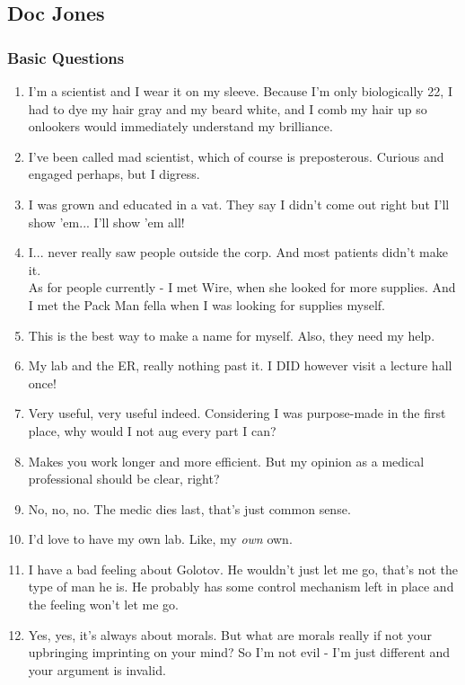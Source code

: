 \def\pfcname{Doc Jones}
\subsection{\pfcname}
\subsubsection{Basic Questions}
\begin{enumerate}
	\setlength\itemsep{-8mm}
	\item I'm a scientist and I wear it on my sleeve. Because I'm only biologically 22, I had to dye my hair gray and my beard white, and I comb my hair up so onlookers would immediately understand my brilliance.
	\item I've been called mad scientist, which of course is preposterous. Curious and engaged perhaps, but I digress.
	\item I was grown and educated in a vat. They say I didn't come out right but I'll show 'em... I'll show 'em all!
	\item I... never really saw people outside the corp. And most patients didn't make it.
		\\%
		As for people currently - I met Wire, when she looked for more supplies.
		And I met the Pack Man fella when I was looking for supplies myself.
	\item This is the best way to make a name for myself. Also, they need my help.
	\item My lab and the ER, really nothing past it. I DID however visit a lecture hall once!
	\item Very useful, very useful indeed. Considering I was purpose-made in the first place, why would I not aug every part I can?
	\item Makes you work longer and more efficient. But my opinion as a medical professional should be clear, right?
	\item No, no, no. The medic dies last, that's just common sense.
	\item I'd love to have my own lab. Like, my \textit{own} own.
	\item I have a bad feeling about Golotov. He wouldn't just let me go, that's not the type of man he is. He probably has some control mechanism left in place and the feeling won't let me go.
	\item Yes, yes, it's always about morals. But what are morals really if not your upbringing imprinting on your mind? So I'm not evil - I'm just different and your argument is invalid.

\end{enumerate}
